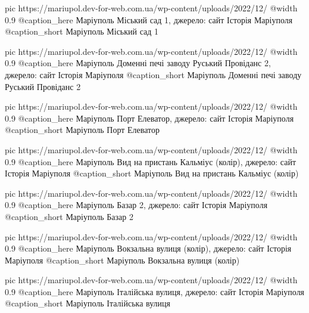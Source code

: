 	pic https://mariupol.dev-for-web.com.ua/wp-content/uploads/2022/12/%
	@width 0.9
	@caption_here Маріуполь Міський сад 1, джерело: сайт Історія Маріуполя
	@caption_short Маріуполь Міський сад 1

	pic https://mariupol.dev-for-web.com.ua/wp-content/uploads/2022/12/%
	@width 0.9
	@caption_here Маріуполь Доменні печі заводу Руський Провіданс 2, джерело: сайт Історія Маріуполя
	@caption_short Маріуполь Доменні печі заводу Руський Провіданс 2

	pic https://mariupol.dev-for-web.com.ua/wp-content/uploads/2022/12/%
	@width 0.9
	@caption_here Маріуполь Порт Елеватор, джерело: сайт Історія Маріуполя
	@caption_short Маріуполь Порт Елеватор

	pic https://mariupol.dev-for-web.com.ua/wp-content/uploads/2022/12/%
	@width 0.9
	@caption_here Маріуполь Вид на пристань Кальміус (колір), джерело: сайт Історія Маріуполя
	@caption_short Маріуполь Вид на пристань Кальміус (колір)

	pic https://mariupol.dev-for-web.com.ua/wp-content/uploads/2022/12/%
	@width 0.9
	@caption_here Маріуполь Базар 2, джерело: сайт Історія Маріуполя
	@caption_short Маріуполь Базар 2

	pic https://mariupol.dev-for-web.com.ua/wp-content/uploads/2022/12/%
	@width 0.9
	@caption_here Маріуполь Вокзальна вулиця (колір), джерело: сайт Історія Маріуполя
	@caption_short Маріуполь Вокзальна вулиця (колір)

	pic https://mariupol.dev-for-web.com.ua/wp-content/uploads/2022/12/%
	@width 0.9
	@caption_here Маріуполь Італійська вулиця, джерело: сайт Історія Маріуполя
	@caption_short Маріуполь Італійська вулиця

